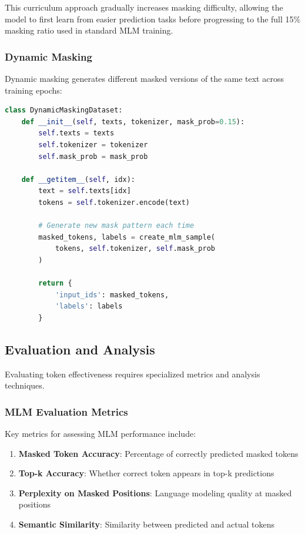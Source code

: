 This curriculum approach gradually increases masking difficulty, allowing the model to first learn from easier prediction tasks before progressing to the full 15\% masking ratio used in standard MLM training.

\subsubsection{Dynamic Masking}

Dynamic masking generates different masked versions of the same text across training epochs:

\begin{lstlisting}[language=Python, caption=Dynamic masking implementation]
class DynamicMaskingDataset:
    def __init__(self, texts, tokenizer, mask_prob=0.15):
        self.texts = texts
        self.tokenizer = tokenizer
        self.mask_prob = mask_prob
    
    def __getitem__(self, idx):
        text = self.texts[idx]
        tokens = self.tokenizer.encode(text)
        
        # Generate new mask pattern each time
        masked_tokens, labels = create_mlm_sample(
            tokens, self.tokenizer, self.mask_prob
        )
        
        return {
            'input_ids': masked_tokens,
            'labels': labels
        }
\end{lstlisting}

\subsection{Evaluation and Analysis}

Evaluating \mask{} token effectiveness requires specialized metrics and analysis techniques.

\subsubsection{MLM Evaluation Metrics}

Key metrics for assessing MLM performance include:

\begin{enumerate}
\item \textbf{Masked Token Accuracy}: Percentage of correctly predicted masked tokens
\item \textbf{Top-k Accuracy}: Whether correct token appears in top-k predictions
\item \textbf{Perplexity on Masked Positions}: Language modeling quality at masked positions
\item \textbf{Semantic Similarity}: Similarity between predicted and actual tokens
\end{enumerate}

